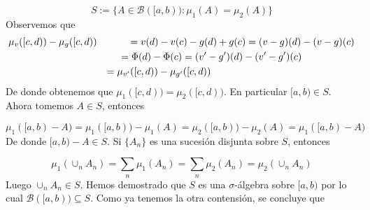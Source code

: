 \documentclass[12pt]{article}
\begin{document}
    \[S := \{A\in \mathscr{B}([a,b)) : \mu_1(A) = \mu_2(A)\}\]
    Observemos que 
    \begin{equation*}
        \begin{aligned}
            &\mu_v([c,d))-\mu_g([c,d)) & = v(d)-v(c)-g(d)+g(c) = (v-g)(d)-(v-g)(c) \\
            & & = \Phi(d)-\Phi(c) = (v'-g')(d)-(v'-g')(c) \hspace*{54pt}\\
            & & = \mu_{v'}([c,d))-\mu_{g'}([c,d)) \hspace*{147pt}
        \end{aligned}
    \end{equation*}
    De donde obtenemos que $\mu_1([c,d)) = \mu_2([c,d))$. En particular $[a,b)\in S$.
    Ahora tomemos $A\in S$, entonces 

    \[\mu_1([a,b)-A) = \mu_1([a,b))-\mu_1(A) = \mu_2([a,b))-\mu_2(A) = \mu_1([a,b)-A)\]
    De donde $[a,b)-A\in S$. Si $\{A_n\}$ es una sucesi\'on disjunta sobre $S$, entonces

    \[\mu_1(\cup_nA_n) = \sum_n\mu_1(A_n) = \sum_n\mu_2(A_n) = \mu_2(\cup_nA_n) \]
    Luego $\cup_nA_n\in S$. Hemos demostrado que $S$ es una $\sigma$-\'algebra sobre 
    $[a,b)$ por lo cual $\mathscr{B}([a,b))\subseteq S$. Como ya tenemos la otra 
    contensi\'on, se concluye que 
\end{document}
